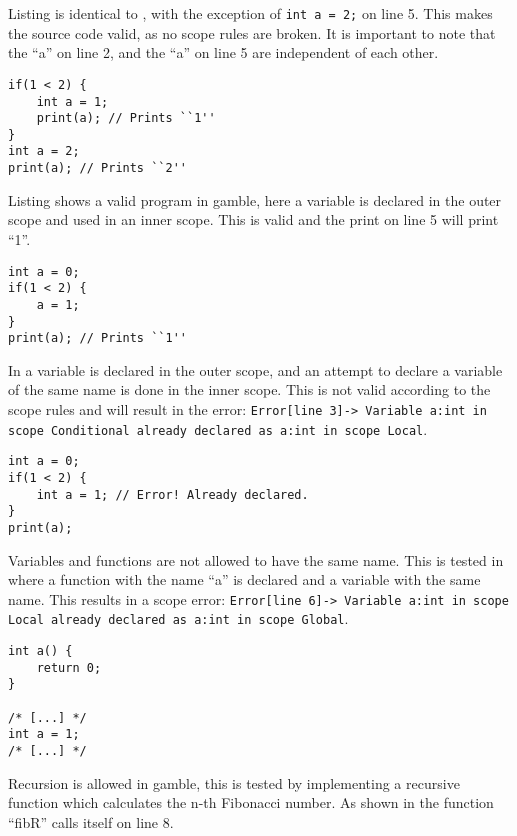 Listing  is identical to , with the exception of \texttt{int a = 2;} on line 5.
This makes the source code valid, as no scope rules are broken.
It is important to note that the ``a'' on line 2, and the ``a'' on line 5 are independent of each other.

\begin{lstlisting}[caption={Example of a valid program in \gls{gamble}},label={lst:scope2},frame=tb]
if(1 < 2) {
    int a = 1;
    print(a); // Prints ``1''
}
int a = 2;
print(a); // Prints ``2''
\end{lstlisting}

Listing  shows a valid program in \gls{gamble}, here a variable is declared in the outer scope and used in an inner scope.
This is valid and the print on line 5 will print ``1''.

\begin{lstlisting}[caption={Example of a valid program in \gls{gamble}},label={lst:scope3},frame=tb]
int a = 0;
if(1 < 2) {
    a = 1;
}
print(a); // Prints ``1''
\end{lstlisting}

In  a variable is declared in the outer scope, and an attempt to declare a variable of the same name is done in the inner scope.
This is not valid according to the scope rules and will result in the error: \texttt{Error[line    3]-> Variable a:int in scope Conditional already declared as a:int in scope Local}.

\begin{lstlisting}[caption={Example of a redeclaration error in \gls{gamble}},label={lst:scope4},frame=tb]
int a = 0;
if(1 < 2) {
    int a = 1; // Error! Already declared.
}
print(a);
\end{lstlisting}

Variables and functions are not allowed to have the same name.
This is tested in  where a function with the name ``a'' is declared and a variable with the same name.
This results in a scope error: \texttt{Error[line    6]-> Variable a:int in scope Local already declared as a:int in scope Global}.

\begin{lstlisting}[caption={Example of a redeclaration error in \gls{gamble}},label={lst:scope5},frame=tb]
int a() {
    return 0;
}

/* [...] */
int a = 1;
/* [...] */
\end{lstlisting}

Recursion is allowed in \gls{gamble}, this is tested by implementing a recursive function which calculates the n-th Fibonacci number.
As shown in  the function ``fibR'' calls itself on line 8.

